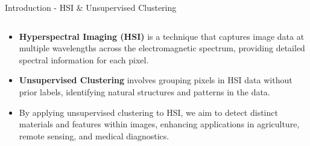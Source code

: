 \documentclass[10pt,svgnames,fragile]{beamer}
\begin{document}
\begin{frame}{Introduction - HSI \& Unsupervised Clustering}
\begin{columns}
        \begin{column}{0.62\textwidth}
            \begin{itemize}
                \item \small \textbf{Hyperspectral Imaging (HSI)} is a technique that captures image data at multiple wavelengths across the electromagnetic spectrum, providing detailed spectral information for each pixel.
                \item \small \textbf{Unsupervised Clustering} involves grouping pixels in HSI data without prior labels, identifying natural structures and patterns in the data.
                \item \small By applying unsupervised clustering to HSI, we aim to detect distinct materials and features within images, enhancing applications in agriculture, remote sensing, and medical diagnostics.
            \end{itemize}
        \end{column}
    \end{columns}
\end{frame}
\end{document}
